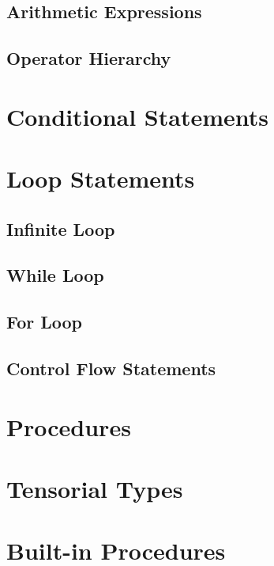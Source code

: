 \subsection{Arithmetic Expressions}
\subsection{Operator Hierarchy}

\section{Conditional Statements}

\section{Loop Statements}
\subsection{Infinite Loop}
\subsection{While Loop}
\subsection{For Loop}
\subsection{Control Flow Statements}

\section{Procedures}

\section{Tensorial Types}

\section{Built-in Procedures}
